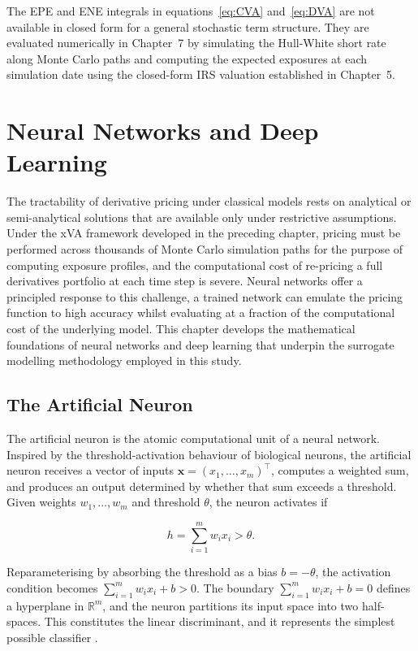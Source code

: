     \noindent
    The EPE and ENE integrals in equations~\eqref{eq:CVA} and~\eqref{eq:DVA} are not available in closed form for a general stochastic term structure. They are evaluated numerically in Chapter~7 by simulating the Hull-White short rate along Monte Carlo paths and computing the expected exposures at each simulation date using the closed-form IRS valuation established in Chapter~5.

    \chapter{Neural Networks and Deep Learning}

    The tractability of derivative pricing under classical models rests on analytical or semi-analytical solutions that are available only under restrictive assumptions. Under the xVA framework developed in the preceding chapter, pricing must be performed across thousands of Monte Carlo simulation paths for the purpose of computing exposure profiles, and the computational cost of re-pricing a full derivatives portfolio at each time step is severe. Neural networks offer a principled response to this challenge, a trained network can emulate the pricing function to high accuracy whilst evaluating at a fraction of the computational cost of the underlying model. This chapter develops the mathematical foundations of neural networks and deep learning that underpin the surrogate modelling methodology employed in this study.

    \section*{The Artificial Neuron}

    The artificial neuron is the atomic computational unit of a neural network. Inspired by the threshold-activation behaviour of biological neurons, the artificial neuron receives a vector of inputs $\mathbf{x} = (x_1, \ldots, x_m)^{\top}$, computes a weighted sum, and produces an output determined by whether that sum exceeds a threshold. Given weights $w_1, \ldots, w_m$ and threshold $\theta$, the neuron activates if

    \[
    h = \sum_{i=1}^{m} w_i x_i > \theta.
    \]

    \noindent 
    Reparameterising by absorbing the threshold as a bias $b = -\theta$, the activation condition becomes $\sum_{i=1}^{m} w_i x_i + b > 0$. The boundary $\sum_{i=1}^{m} w_i x_i + b = 0$ defines a hyperplane in $\mathbb{R}^m$, and the
    neuron partitions its input space into two half-spaces. This constitutes the linear discriminant, and it represents the simplest possible classifier \citep{goodfellow2016deep}. \\

